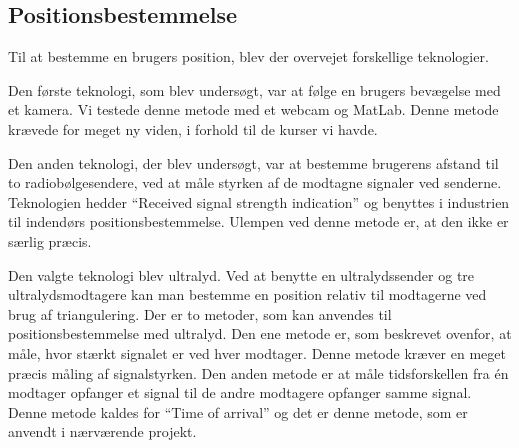 \subsection{Positionsbestemmelse}
\label{sec:Positionsbestemmelse_analyse}

Til at bestemme en brugers position, blev der overvejet forskellige teknologier.

Den første teknologi, som blev undersøgt, var at følge en brugers bevægelse med et kamera. Vi testede denne metode med et webcam og MatLab. Denne metode krævede for meget ny viden, i forhold til de kurser vi havde.

Den anden teknologi, der blev undersøgt, var at bestemme brugerens afstand til to radiobølgesendere, ved at måle styrken af de modtagne signaler ved senderne. Teknologien hedder ``Received signal strength indication'' og benyttes i industrien til indendørs positionsbestemmelse. Ulempen ved denne metode er, at den ikke er særlig præcis.

Den valgte teknologi blev ultralyd. Ved at benytte en ultralydssender og tre ultralydsmodtagere kan man bestemme en position relativ til modtagerne ved brug af triangulering.
Der er to metoder, som kan anvendes til positionsbestemmelse med ultralyd. Den ene metode er, som beskrevet ovenfor, at måle, hvor stærkt signalet er ved hver modtager. Denne metode kræver en meget præcis måling af signalstyrken. Den anden metode er at måle tidsforskellen fra én modtager opfanger et signal til de andre modtagere opfanger samme signal. Denne metode kaldes for ``Time of arrival'' og det er denne metode, som er anvendt i nærværende projekt.

